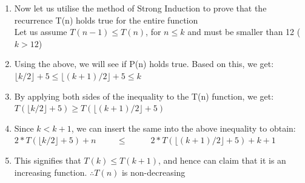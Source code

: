 \documentclass[11pt]{article}
\begin{document}
\begin{enumerate}
\begin{enumerate}
\begin{enumerate}
            \item Now let us utilise the method of Strong Induction to prove that the recurrence T(n) holds true for the entire function\\
            Let us assume $T(n-1) \leq T(n)$, for $n \leq k$ and must be smaller than 12 ($k > 12$)
            \item Using the above, we will see if P(n) holds true. Based on this, we get:\\
            $\lfloor k/2 \rfloor + 5 \leq \lfloor (k+1)/2 \rfloor + 5 \leq k$
            \item By applying both sides of the inequality to the T(n) function, we get:\\
            $T(\lfloor k/2 \rfloor + 5) \geq T(\lfloor (k+1)/2 \rfloor + 5)$
            \item Since $k < k+1$, we can insert the same into the above inequality to obtain:\\
            $2*T(\lfloor k/2 \rfloor + 5) + n \hspace{1cm}\leq \hspace{1cm}$ $ 2*T(\lfloor (k+1)/2 \rfloor + 5) + k + 1$
            \item This signifies that $T(k) \leq T(k+1)$, and hence can claim that it is an increasing function.
            $\therefore T(n)$ is non-decreasing
            
        \end{enumerate}


\end{enumerate}
\end{enumerate}
\end{document}
